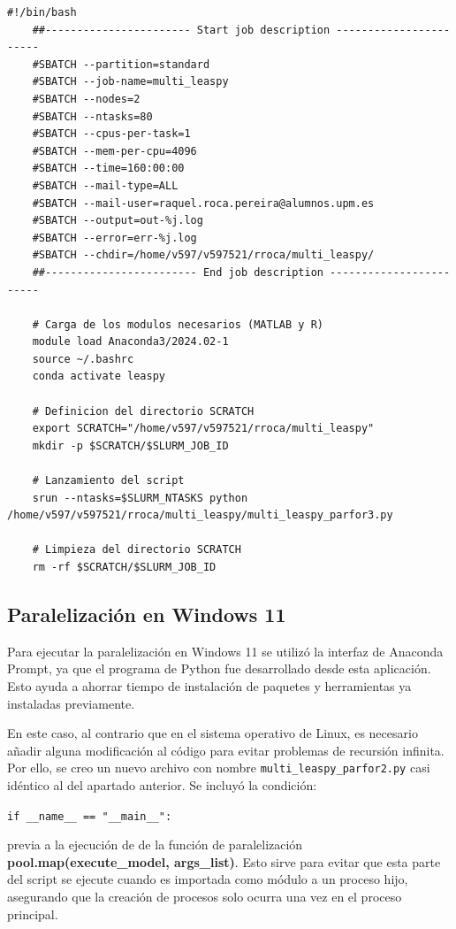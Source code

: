\begin{lstlisting}[caption={Archivo sh para la ejecución del programa en Magerit}, label={lst:archivo_magerit}]
	#!/bin/bash
	##----------------------- Start job description ----------------------- 
	#SBATCH --partition=standard
	#SBATCH --job-name=multi_leaspy
	#SBATCH --nodes=2
	#SBATCH --ntasks=80
	#SBATCH --cpus-per-task=1
	#SBATCH --mem-per-cpu=4096
	#SBATCH --time=160:00:00
	#SBATCH --mail-type=ALL
	#SBATCH --mail-user=raquel.roca.pereira@alumnos.upm.es
	#SBATCH --output=out-%j.log
	#SBATCH --error=err-%j.log
	#SBATCH --chdir=/home/v597/v597521/rroca/multi_leaspy/
	##------------------------ End job description ------------------------ 
	
	# Carga de los modulos necesarios (MATLAB y R)
	module load Anaconda3/2024.02-1
	source ~/.bashrc
	conda activate leaspy
	
	# Definicion del directorio SCRATCH
	export SCRATCH="/home/v597/v597521/rroca/multi_leaspy"
	mkdir -p $SCRATCH/$SLURM_JOB_ID
	
	# Lanzamiento del script
	srun --ntasks=$SLURM_NTASKS python /home/v597/v597521/rroca/multi_leaspy/multi_leaspy_parfor3.py
	
	# Limpieza del directorio SCRATCH
	rm -rf $SCRATCH/$SLURM_JOB_ID
\end{lstlisting}



\subsection{Paralelización en Windows 11}
Para ejecutar la paralelización en Windows 11 se utilizó la interfaz de Anaconda Prompt, ya que el programa de Python fue desarrollado desde esta aplicación. Esto ayuda a ahorrar tiempo de instalación de paquetes y herramientas ya instaladas previamente. 

En este caso, al contrario que en el sistema operativo de Linux, es necesario añadir alguna modificación al código para evitar problemas de recursión infinita. Por ello, se creo un nuevo archivo con nombre \texttt{multi\_leaspy\_parfor2.py} casi idéntico al del apartado anterior. Se incluyó la condición:
\begin{center}
	\texttt{if \_\_name\_\_ == "\_\_main\_\_":
	}
\end{center} 
previa a la ejecución de de la función de paralelización \textbf{pool.map(execute\_model, args\_list)}. Esto sirve para evitar que esta parte del script se ejecute cuando es importada como módulo a un proceso hijo, asegurando que la creación de procesos solo ocurra una vez en el proceso principal.

